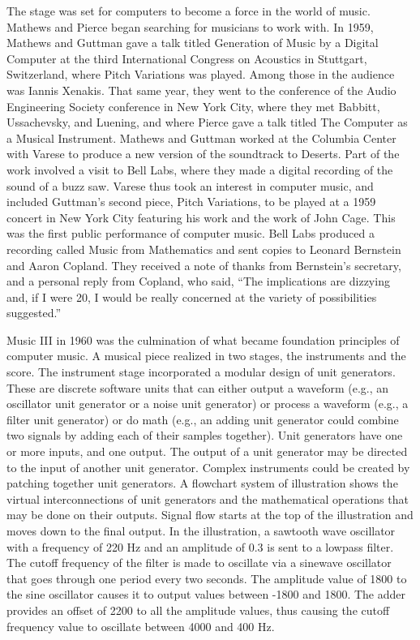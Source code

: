The stage was set for computers to become a force in the world of music. Mathews and Pierce began searching for musicians to work with. In 1959, Mathews and Guttman gave a talk titled Generation of Music by a Digital Computer at the third International Congress on Acoustics in Stuttgart, Switzerland, where Pitch Variations was played. Among those in the audience was Iannis Xenakis. That same year, they went to the conference of the Audio Engineering Society conference in New York City, where they met Babbitt, Ussachevsky, and Luening, and where Pierce gave a talk titled The Computer as a Musical Instrument. Mathews and Guttman worked at the Columbia Center with Varese to produce a new version of the soundtrack to Deserts. Part of the work involved a visit to Bell Labs, where they made a digital recording of the sound of a buzz saw. Varese thus took an interest in computer music, and included Guttman's second piece, Pitch Variations, to be played at a 1959 concert in New York City featuring his work and the work of John Cage. This was the first public performance of computer music. Bell Labs produced a recording called Music from Mathematics and sent copies to Leonard Bernstein and Aaron Copland. They received a note of thanks from Bernstein's secretary, and a personal reply from Copland, who said, ``The implications are dizzying and, if I were 20, I would be really concerned at the variety of possibilities suggested.''

Music III in 1960 was the culmination of what became foundation principles of computer music. A musical piece realized in two stages, the instruments and the score. The instrument stage incorporated a modular design of unit generators. These are discrete software units that can either output a waveform (e.g., an oscillator unit generator or a noise unit generator) or process a waveform (e.g., a filter unit generator) or do math (e.g., an adding unit generator could combine two signals by adding each of their samples together). Unit generators have one or more inputs, and one output. The output of a unit generator may be directed to the input of another unit generator. Complex instruments could be created by patching together unit generators. A flowchart system of illustration shows the virtual interconnections of unit generators and the mathematical operations that may be done on their outputs. Signal flow starts at the top of the illustration and moves down to the final output. In the illustration, a sawtooth wave oscillator with a frequency of 220 Hz and an amplitude of 0.3 is sent to a lowpass filter. The cutoff frequency of the filter is made to oscillate via a sinewave oscillator that goes through one period every two seconds. The amplitude value of 1800 to the sine oscillator causes it to output values between -1800 and 1800. The adder provides an offset of 2200 to all the amplitude values, thus causing the cutoff frequency value to oscillate between 4000 and 400 Hz.

